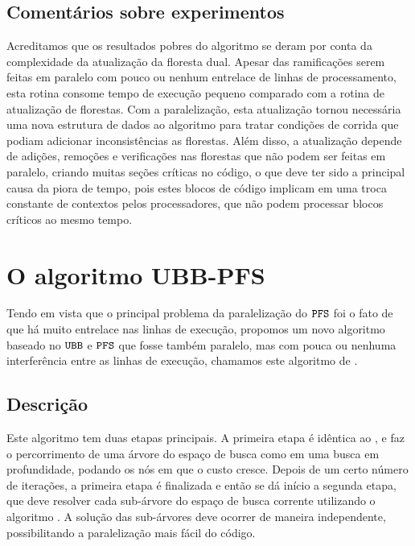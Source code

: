 \subsection{Comentários sobre experimentos}
Acreditamos que os resultados pobres do algoritmo  se 
deram por conta da complexidade da atualização da floresta dual. 
Apesar das ramificações serem feitas em paralelo com pouco ou nenhum
entrelace de linhas de processamento, esta rotina consome tempo de
execução pequeno comparado com a rotina de atualização de florestas.
Com a paralelização, esta atualização tornou necessária uma nova 
estrutura de dados ao algoritmo para tratar condições de corrida 
que podiam adicionar inconsistências as florestas. Além disso, a 
atualização depende de adições, remoções e verificações nas 
florestas que não podem ser feitas em paralelo, criando muitas seções
críticas no código, o que deve ter sido a principal causa da piora
de tempo, pois estes blocos de código implicam em uma troca constante
de contextos pelos processadores, que não podem processar blocos
críticos ao mesmo tempo.

\section{O algoritmo UBB-PFS}
Tendo em vista que o principal problema da paralelização do 
$\texttt{PFS}$ foi o fato de que há muito entrelace nas linhas de 
execução, propomos um novo algoritmo baseado no $\texttt{UBB}$ e 
$\texttt{PFS}$ que fosse também paralelo, mas com pouca ou nenhuma 
interferência entre as linhas de execução, chamamos este algoritmo de 
.

\subsection{Descrição}
Este algoritmo tem duas etapas principais. A primeira etapa é idêntica
ao , e faz o percorrimento de uma árvore do espaço de busca
como em uma busca em profundidade, podando os nós em que o custo cresce.
Depois de um certo número de iterações, a primeira etapa é finalizada e 
então se dá início a segunda etapa, que deve resolver cada sub-árvore 
do espaço de busca corrente utilizando o algoritmo . A 
solução das sub-árvores deve ocorrer de maneira independente, 
possibilitando a paralelização mais fácil do código.

